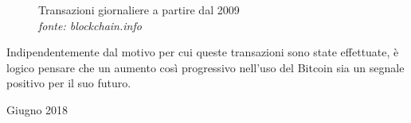 \documentclass {article}
\begin{document}
\vspace {0.5cm}
\begin{figure}[htb!]
\caption {Transazioni giornaliere a partire dal 2009\\\textit{fonte: blockchain.info}}
\end{figure}
\vspace {0.2cm}
\noindent
%
Indipendentemente dal motivo per cui queste transazioni sono state effettuate, è logico pensare che un aumento così progressivo nell'uso del Bitcoin sia un segnale positivo per il suo futuro.


\newpage

\printbibliography

\newpage

\shipout\null


\centering
\vspace*{1cm}
\vfill
\Huge{Giugno 2018}
\vspace{1cm}
\vfill
\end{document}
